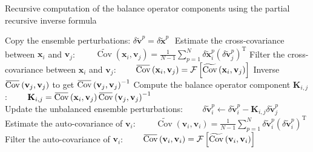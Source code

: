 \documentclass[12pt]{scrartcl}
\newcommand{\overbar}[1]{\mkern 1.5mu\overline{\mkern-1.5mu#1\mkern-1.5mu}\mkern 1.5mu}
\DeclareMathOperator{\Cov}{Cov}
\begin{document}
\begin{algorithm}[!ht]
\caption{Recursive computation of the balance operator components using the partial recursive inverse formula \label{algo:partial}}
\begin{algorithmic}
\STATE Copy the ensemble perturbations:
\STATE $\delta \widetilde{\mathbf{v}}^p = \delta \widetilde{\mathbf{x}}^p$
\ENDFOR
\STATE $ $
\STATE Estimate the cross-covariance between $\mathbf{x}_i$ and $\mathbf{v}_j$:
\STATE $\displaystyle \qquad \widetilde{\Cov}\left(\mathbf{x}_i,\mathbf{v}_j\right) = \frac{1}{N-1} \sum_{p=1}^N \delta \widetilde{\mathbf{x}}^p_i \left(\delta \widetilde{\mathbf{v}}^p_j\right)^\mathrm{T}$
\STATE Filter the cross-covariance between $\mathbf{x}_i$ and $\mathbf{v}_j$:
\STATE $\displaystyle \qquad \overbar{\Cov}\left(\mathbf{x}_i,\mathbf{v}_j\right) = \mathcal{F} \left[\widetilde{\Cov}\left(\mathbf{x}_i,\mathbf{v}_j\right)\right]$
\STATE Inverse $\overbar{\Cov}\left(\mathbf{v}_j,\mathbf{v}_j\right)$ to get $\overbar{\Cov} \left(\mathbf{v}_j,\mathbf{v}_j\right)^{-1}$
\STATE Compute the balance operator component $\mathbf{K}_{i,j}$:
\STATE $\displaystyle \qquad \mathbf{K}_{i,j} = \overbar{\Cov} \left(\mathbf{x}_i,\mathbf{v}_j\right)\overbar{\Cov} \left(\mathbf{v}_j,\mathbf{v}_j\right)^{-1}$
\STATE $  $\\
\STATE Update the unbalanced ensemble perturbations:
\STATE $\displaystyle \qquad \delta \widetilde{\mathbf{v}}^p_i \leftarrow \delta \widetilde{\mathbf{v}}^p_i - \mathbf{K}_{i,j} \delta \widetilde{\mathbf{v}}^p_j$
\ENDFOR
\ENDFOR
\STATE $  $\\
\STATE Estimate the auto-covariance of $\mathbf{v}_i$:
\STATE $\displaystyle \qquad \widetilde{\Cov}\left(\mathbf{v}_i,\mathbf{v}_i\right) = \frac{1}{N-1} \sum_{p=1}^N \delta \widetilde{\mathbf{v}}^p_i \left(\delta \widetilde{\mathbf{v}}^p_i\right)^\mathrm{T}$
\STATE Filter the auto-covariance of $\mathbf{v}_i$:
\STATE $\displaystyle \qquad \overbar{\Cov}\left(\mathbf{v}_i,\mathbf{v}_i\right) = \mathcal{F} \left[\widetilde{\Cov}\left(\mathbf{v}_i,\mathbf{v}_i\right)\right]$
\ENDIF
\ENDFOR
\end{algorithmic}
\end{algorithm}
\end{document}
